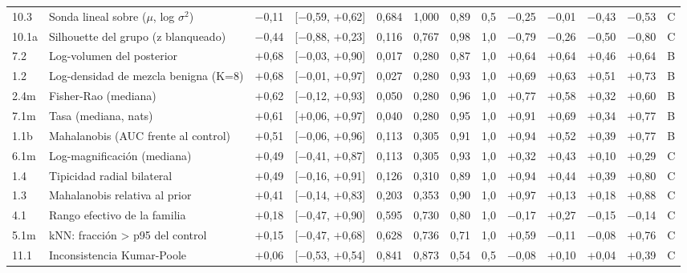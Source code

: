 \begin{longtable}{@{}l>{\raggedright\arraybackslash}p{3.6cm}rcrrrrrrrrc@{}}
10.3 & Sonda lineal sobre ($\mu$, log $\sigma^2$) & $-$0{,}11 & [$-$0{,}59, $+$0{,}62] & 0{,}684 & 1{,}000 & 0{,}89 & 0{,}5 & $-$0{,}25 & $-$0{,}01 & $-$0{,}43 & $-$0{,}53 & C \\
10.1a & Silhouette del grupo (z blanqueado) & $-$0{,}44 & [$-$0{,}88, $+$0{,}23] & 0{,}116 & 0{,}767 & 0{,}98 & 1{,}0 & $-$0{,}79 & $-$0{,}26 & $-$0{,}50 & $-$0{,}80 & C \\
7.2 & Log-volumen del posterior & $+$0{,}68 & [$-$0{,}03, $+$0{,}90] & 0{,}017 & 0{,}280 & 0{,}87 & 1{,}0 & $+$0{,}64 & $+$0{,}64 & $+$0{,}46 & $+$0{,}64 & B \\
1.2 & Log-densidad de mezcla benigna (K=8) & $+$0{,}68 & [$-$0{,}01, $+$0{,}97] & 0{,}027 & 0{,}280 & 0{,}93 & 1{,}0 & $+$0{,}69 & $+$0{,}63 & $+$0{,}51 & $+$0{,}73 & B \\
2.4m & Fisher-Rao (mediana) & $+$0{,}62 & [$-$0{,}12, $+$0{,}93] & 0{,}050 & 0{,}280 & 0{,}96 & 1{,}0 & $+$0{,}77 & $+$0{,}58 & $+$0{,}32 & $+$0{,}60 & B \\
7.1m & Tasa (mediana, nats) & $+$0{,}61 & [$+$0{,}06, $+$0{,}97] & 0{,}040 & 0{,}280 & 0{,}95 & 1{,}0 & $+$0{,}91 & $+$0{,}69 & $+$0{,}34 & $+$0{,}77 & B \\
1.1b & Mahalanobis (AUC frente al control) & $+$0{,}51 & [$-$0{,}06, $+$0{,}96] & 0{,}113 & 0{,}305 & 0{,}91 & 1{,}0 & $+$0{,}94 & $+$0{,}52 & $+$0{,}39 & $+$0{,}77 & B \\
6.1m & Log-magnificación (mediana) & $+$0{,}49 & [$-$0{,}41, $+$0{,}87] & 0{,}113 & 0{,}305 & 0{,}93 & 1{,}0 & $+$0{,}32 & $+$0{,}43 & $+$0{,}10 & $+$0{,}29 & C \\
1.4 & Tipicidad radial bilateral & $+$0{,}49 & [$-$0{,}16, $+$0{,}91] & 0{,}126 & 0{,}310 & 0{,}89 & 1{,}0 & $+$0{,}94 & $+$0{,}44 & $+$0{,}39 & $+$0{,}80 & C \\
1.3 & Mahalanobis relativa al prior & $+$0{,}41 & [$-$0{,}14, $+$0{,}83] & 0{,}203 & 0{,}353 & 0{,}90 & 1{,}0 & $+$0{,}97 & $+$0{,}13 & $+$0{,}18 & $+$0{,}88 & C \\
4.1 & Rango efectivo de la familia & $+$0{,}18 & [$-$0{,}47, $+$0{,}90] & 0{,}595 & 0{,}730 & 0{,}80 & 1{,}0 & $-$0{,}17 & $+$0{,}27 & $-$0{,}15 & $-$0{,}14 & C \\
5.1m & kNN: fracción > p95 del control & $+$0{,}15 & [$-$0{,}47, $+$0{,}68] & 0{,}628 & 0{,}736 & 0{,}71 & 1{,}0 & $+$0{,}59 & $-$0{,}11 & $-$0{,}08 & $+$0{,}76 & C \\
11.1 & Inconsistencia Kumar-Poole & $+$0{,}06 & [$-$0{,}53, $+$0{,}54] & 0{,}841 & 0{,}873 & 0{,}54 & 0{,}5 & $-$0{,}08 & $+$0{,}10 & $+$0{,}04 & $+$0{,}39 & C \\

\end{longtable}
